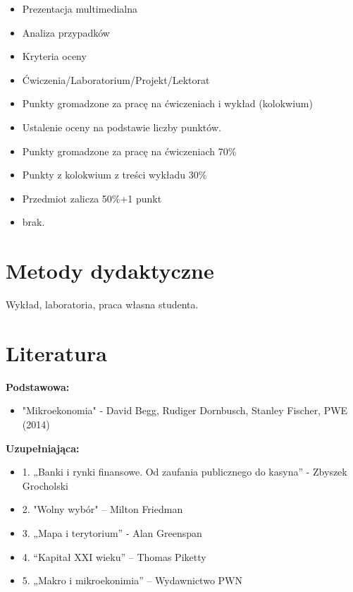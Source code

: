 \documentclass[12pt, a4paper]{article}
\begin{document}
\begin{itemize}
  \item Prezentacja multimedialna
  \item Analiza przypadków
  \item Kryteria oceny
  \item Ćwiczenia/Laboratorium/Projekt/Lektorat
  \item Punkty gromadzone za pracę na ćwiczeniach i wykład (kolokwium)
  \item Ustalenie oceny na podstawie liczby punktów.
  \item Punkty gromadzone za pracę na ćwiczeniach 70\%
  \item Punkty z kolokwium z treści wykładu 30\%
  \item Przedmiot zalicza 50\%+1 punkt
  \item brak.
\end{itemize}

\section{Metody dydaktyczne}

Wykład, laboratoria, praca własna studenta.

\section{Literatura}

\textbf{Podstawowa:}
\begin{itemize}
  \item "Mikroekonomia" - David Begg, Rudiger Dornbusch, Stanley Fischer, PWE (2014)
\end{itemize}

\textbf{Uzupełniająca:}
\begin{itemize}
  \item 1. „Banki i rynki finansowe. Od zaufania publicznego do kasyna” - Zbyszek Grocholski
  \item 2. "Wolny wybór" – Milton Friedman
  \item 3. „Mapa i terytorium” - Alan Greenspan
  \item 4. “Kapitał XXI wieku” – Thomas Piketty
  \item 5. „Makro i mikroekonimia” – Wydawnictwo PWN
\end{itemize}
\end{document}
